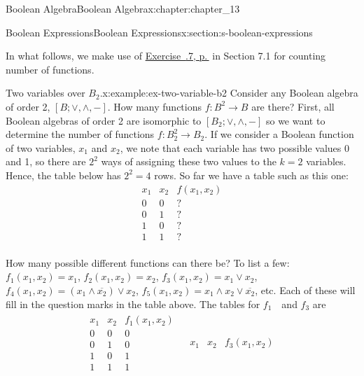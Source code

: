 \documentclass[twoside,10pt,]{book}
\newcommand{\xreffont}{\relax}
\numberwithin{equation}{section}
\begin{document}
\begin{chapterptx}{Boolean Algebra}{}{Boolean Algebra}{}{}{x:chapter:chapter_13}
\begin{sectionptx}{Boolean Expressions}{}{Boolean Expressions}{}{}{x:section:s-boolean-expressions}
\par
In what follows, we make use of  \hyperlink{x:exercise:exercise-counting-functions}{Exercise~{\xreffont 7.1.7}, p.\,\pageref{x:exercise:exercise-counting-functions}} in Section 7.1 for counting number of functions.%
\begin{example}{Two variables over \(B_2\).}{x:example:ex-two-variable-b2}%
Consider any Boolean algebra of order 2, \([B; \lor, \land, - ]\). How many functions \(f:B^2\to B\) are there? First, all Boolean algebras of order 2 are isomorphic to \(\left[B_2; \lor , \land, - \right]\) so we want to determine the number of functions \(f:B_2^2\to B_2\). If we consider a Boolean function of two variables, \(x_1\) and \(x_2\), we note that each variable has two possible values 0 and 1, so there are \(2^2\) ways of assigning these two values to the \(k=2\) variables. Hence, the table below has \(2^2=4\) rows. So far we have a table such as this one:%
\begin{equation*}
\begin{array}{cc|c}
x_1 & x_2 & f\left(x_1,x_2\right) \\
\hline
0 & 0 & ?\\
0 & 1 & ?\\
1 & 0 & ?\\
1 & 1 & ?\\
\end{array}
\end{equation*}
%
\par
How many possible different functions can there be? To list a few:\(f_1\left(x_1, x_2\right)=x_1\), \(f_2\left(x_1,
x_2\right)=x_2\), \(f_3\left(x_1, x_2\right)=x_1\lor x_2\), \(f_4\left(x_1, x_2\right)=\left(x_1\land \overline{x_2}\right)\lor x_2\), \(f_5\left(x_1,
x_2\right)= x_1\land x_2\lor \overline{x_2}\), etc. Each of these will fill in the question marks in the table above. The tables for \(f_1\textrm{ }\) and \(f_3\) are%
\begin{equation*}
\begin{array}{lr}
\begin{array}{cc|c}
x_1 & x_2 & f_1\left(x_1,x_2\right) \\
\hline
0 & 0 & 0\\
0 & 1 & 0\\
1 & 0 & 1\\
1 & 1 & 1\\
\end{array}  &
\begin{array}{cc|c}
x_1 & x_2 & f_3\left(x_1,x_2\right) \\

\end{array}
\end{array}
\end{equation*}
\end{example}
\end{sectionptx}
\end{chapterptx}
\end{document}
